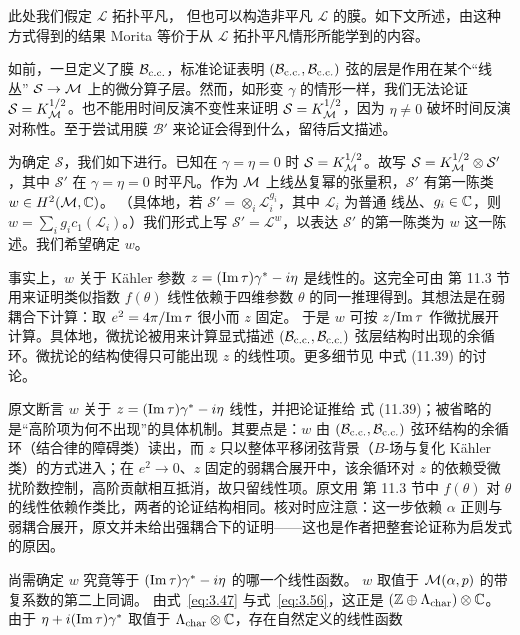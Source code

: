 此处我们假定 ${\mathcal L}$ 拓扑平凡，
但也可以构造非平凡 ${\mathcal L}$ 的膜。如下文所述，由这种方式得到的结果 Morita 等价于从
${\mathcal L}$ 拓扑平凡情形所能学到的内容。

如前，一旦定义了膜 ${\mathcal B}_{\rm c.c.}$，标准论证表明
$({\mathcal B}_{\rm c.c.},{\mathcal B}_{\rm c.c.})$ 弦的层是作用在某个“线丛”
${\mathcal S}\to {\mathcal{M}}$ 上的微分算子层。然而，如形变 $\gamma$ 的情形一样，我们无法论证 ${\mathcal S}=K_{\mathcal{M}}^{1/2}$。也不能用时间反演不变性来证明 ${\mathcal S}=K_{\mathcal{M}}^{1/2}$，因为 $\eta\not= 0$ 破坏时间反演
对称性。至于尝试用膜 ${\mathcal B}'$ 来论证会得到什么，留待后文描述。

为确定 ${\mathcal S}$，我们如下进行。已知在
$\gamma=\eta=0$ 时 ${\mathcal S}=K_{\mathcal{M}}^{1/2}$。故写 ${\mathcal S}=
K_{\mathcal{M}}^{1/2}\otimes {\mathcal S}'$，其中 ${\mathcal S}'$ 在
$\gamma=\eta=0$ 时平凡。作为 ${\mathcal{M}}$ 上线丛复幂的张量积，${\mathcal S}'$ 有第一陈类 $w\in H^2({\mathcal{M}},{\mathbb{C}})$。
（具体地，若 ${\mathcal S}'=\otimes_i{\mathcal L}_i^{g_i}$，其中 ${\mathcal L}_i$ 为普通
线丛、$g_i\in {\mathbb{C}}$，则
$w=\sum_ig_ic_1({\mathcal L}_i)$。）我们形式上写 ${\mathcal S}'={\mathcal
L}^w$，以表达 ${\mathcal S}'$ 的第一陈类为 $w$ 这一陈述。我们希望确定 $w$。

事实上，$w$ 关于 Kähler 参数 $z=({\rm Im}\,\tau)\gamma^*-i\eta$ 是线性的。这完全可由
\cite{ref8} 第 11.3 节用来证明类似指数 $f(\theta)$ 线性依赖于四维参数 $\theta$ 的同一推理得到。其想法是在弱耦合下计算：取 $e^2=4\pi/{\rm Im}\,\tau$ 很小而 $z$ 固定。
于是 $w$ 可按 $z/{\rm Im}\,\tau$ 作微扰展开计算。具体地，微扰论被用来计算显式描述
$({\mathcal B}_{\rm c.c.},{\mathcal B}_{\rm c.c.})$ 弦层结构时出现的余循环。微扰论的结构使得只可能出现 $z$ 的线性项。更多细节见 \cite{ref8} 中式 (11.39) 的讨论。

\begin{yizhu}[含糊点拨]
原文断言 $w$ 关于 $z=({\rm Im}\,\tau)\gamma^*-i\eta$ 线性，并把论证推给 \cite{ref8} 式 (11.39)；被省略的是“高阶项为何不出现”的具体机制。其要点是：$w$ 由 $({\mathcal B}_{\rm c.c.},{\mathcal B}_{\rm c.c.})$ 弦环结构的余循环（结合律的障碍类）读出，而 $z$ 只以整体平移闭弦背景（$B$-场与复化 Kähler 类）的方式进入；在 $e^2\to0$、$z$ 固定的弱耦合展开中，该余循环对 $z$ 的依赖受微扰阶数控制，高阶贡献相互抵消，故只留线性项。原文用 \cite{ref8} 第 11.3 节中 $f(\theta)$ 对 $\theta$ 的线性依赖作类比，两者的论证结构相同。核对时应注意：这一步依赖 $\alpha$ 正则与弱耦合展开，原文并未给出强耦合下的证明——这也是作者把整套论证称为启发式的原因。
\end{yizhu}

尚需确定 $w$ 究竟等于 $({\rm Im}\,\tau)\gamma^*-i\eta$ 的哪一个线性函数。
$w$ 取值于 ${\mathcal{M}}(\alpha,p)$ 的带复系数的第二上同调。
由式~\eqref{eq:3.47} 与式~\eqref{eq:3.56}，这正是 $({\mathbb{Z}}\oplus \Lambda_{\rm char})\otimes{\mathbb{C}}$。
由于 $\eta+i({\rm Im}\,\tau)\gamma^*$
取值于 $\Lambda_{\rm char}\otimes {\mathbb{C}}$，存在自然定义的线性函数

